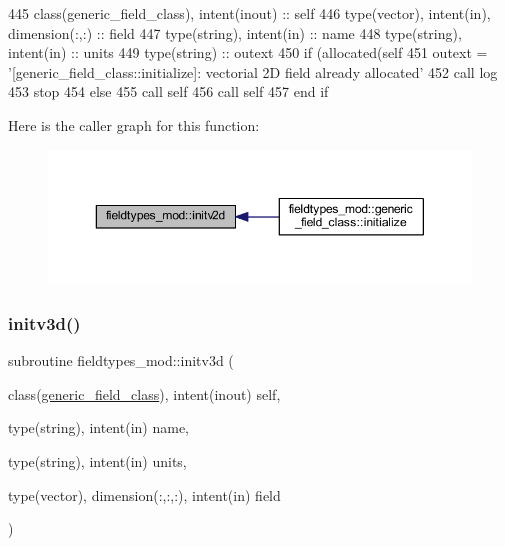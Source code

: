 \begin{DoxyCode}
445     \textcolor{keywordtype}{class}(generic\_field\_class), \textcolor{keywordtype}{intent(inout)} :: self
446     \textcolor{keywordtype}{type}(vector), \textcolor{keywordtype}{intent(in)}, \textcolor{keywordtype}{dimension(:,:)} :: field
447     \textcolor{keywordtype}{type}(string), \textcolor{keywordtype}{intent(in)} :: name
448     \textcolor{keywordtype}{type}(string), \textcolor{keywordtype}{intent(in)} :: units
449     \textcolor{keywordtype}{type}(string) :: outext
450     \textcolor{keywordflow}{if} (\textcolor{keyword}{allocated}(self%
451         outext = \textcolor{stringliteral}{'[generic\_field\_class::initialize]: vectorial 2D field already allocated'}
452         \textcolor{keyword}{call }log%
453         stop
454     \textcolor{keywordflow}{else}
455         \textcolor{keyword}{call }self%
456         \textcolor{keyword}{call }self%
457 \textcolor{keywordflow}{    end if}
\end{DoxyCode}
Here is the caller graph for this function\+:\nopagebreak
\begin{figure}[H]
\begin{center}
\leavevmode
\includegraphics[width=350pt]{namespacefieldtypes__mod_ad1af664e23793260f9c2fcd03829a1f5_icgraph}
\end{center}
\end{figure}
\mbox{\label{namespacefieldtypes__mod_aa0a152c9e5131d3003cc34e4f3b2974d}} 
\subsubsection{\texorpdfstring{initv3d()}{initv3d()}}
{\footnotesize\ttfamily subroutine fieldtypes\+\_\+mod\+::initv3d (\begin{DoxyParamCaption}\item[{class(\mbox{\hyperlink{structfieldtypes__mod_1_1generic__field__class}{generic\+\_\+field\+\_\+class}}), intent(inout)}]{self,  }\item[{type(string), intent(in)}]{name,  }\item[{type(string), intent(in)}]{units,  }\item[{type(vector), dimension(\+:,\+:,\+:), intent(in)}]{field }\end{DoxyParamCaption})\hspace{0.3cm}{\ttfamily [private]}}



